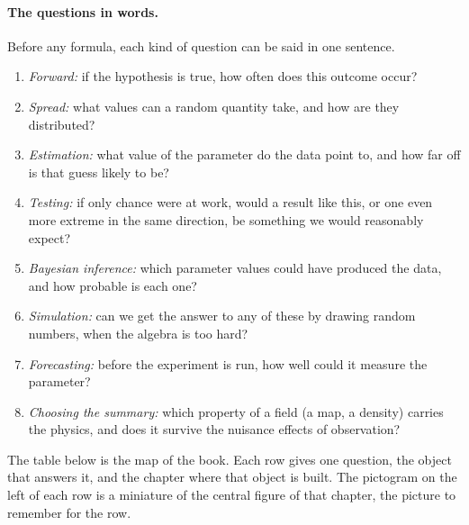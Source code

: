 \paragraph{The questions in words.}
Before any formula, each kind of question can be said in one sentence.
\begin{enumerate}[leftmargin=2em]
  \item \emph{Forward:} if the hypothesis is true, how often does this outcome occur?
  \item \emph{Spread:} what values can a random quantity take, and how are they distributed?
  \item \emph{Estimation:} what value of the parameter do the data point to, and how far off is that guess likely to be?
  \item \emph{Testing:} if only chance were at work, would a result like this, or one even more extreme in the same direction, be something we would reasonably expect?
  \item \emph{Bayesian inference:} which parameter values could have produced the data, and how probable is each one?
  \item \emph{Simulation:} can we get the answer to any of these by drawing random numbers, when the algebra is too hard?
  \item \emph{Forecasting:} before the experiment is run, how well could it measure the parameter?
  \item \emph{Choosing the summary:} which property of a field (a map, a density) carries the physics, and does it survive the nuisance effects of observation?
\end{enumerate}

The table below is the map of the book. Each row gives one question, the
object that answers it, and the chapter where that object is built. The
pictogram on the left of each row is a miniature of the central figure of that
chapter, the picture to remember for the row.

